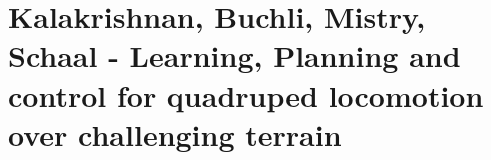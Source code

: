 \section{Kalakrishnan, Buchli, Mistry, Schaal - Learning, Planning and control for quadruped locomotion over challenging terrain}
